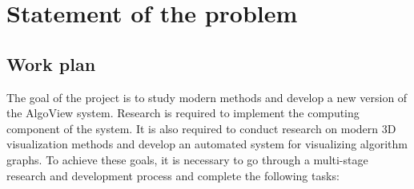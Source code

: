 \section{Statement of the problem}

\subsection{Work plan}

The goal of the project is to study modern methods and develop a new version of the AlgoView system. Research is required to implement the computing component of the system. It is also required to conduct research on modern 3D visualization methods and develop an automated system for visualizing algorithm graphs. To achieve these goals, it is necessary to go through a multi-stage research and development process and complete the following tasks:

